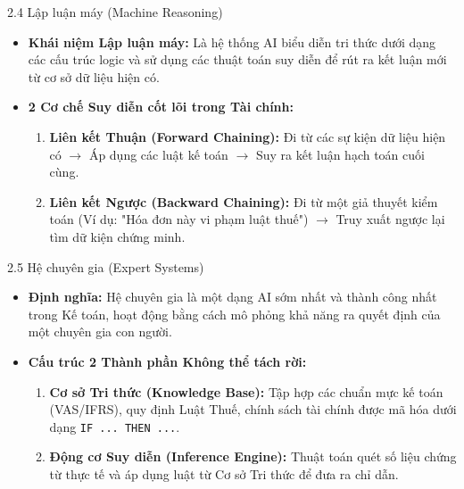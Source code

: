 \documentclass[aspectratio=169]{beamer}
\begin{document}
\begin{frame}{2.4 Lập luận máy (Machine Reasoning)}
    \begin{itemize}
        \item \textbf{Khái niệm Lập luận máy:} Là hệ thống AI biểu diễn tri thức dưới dạng các cấu trúc logic và sử dụng các thuật toán suy diễn để rút ra kết luận mới từ cơ sở dữ liệu hiện có.
        \item \textbf{2 Cơ chế Suy diễn cốt lõi trong Tài chính:}
        \begin{enumerate}
            \item \textbf{Liên kết Thuận (Forward Chaining):} Đi từ các sự kiện dữ liệu hiện có $\rightarrow$ Áp dụng các luật kế toán $\rightarrow$ Suy ra kết luận hạch toán cuối cùng.
            \item \textbf{Liên kết Ngược (Backward Chaining):} Đi từ một giả thuyết kiểm toán (Ví dụ: "Hóa đơn này vi phạm luật thuế") $\rightarrow$ Truy xuất ngược lại tìm dữ kiện chứng minh.
        \end{enumerate}
    \end{itemize}
\end{frame}

\begin{frame}{2.5 Hệ chuyên gia (Expert Systems)}
    \begin{itemize}
        \item \textbf{Định nghĩa:} Hệ chuyên gia là một dạng AI sớm nhất và thành công nhất trong Kế toán, hoạt động bằng cách mô phỏng khả năng ra quyết định của một chuyên gia con người.
        \item \textbf{Cấu trúc 2 Thành phần Không thể tách rời:}
        \begin{enumerate}
            \item \textbf{Cơ sở Tri thức (Knowledge Base):} Tập hợp các chuẩn mực kế toán (VAS/IFRS), quy định Luật Thuế, chính sách tài chính được mã hóa dưới dạng \texttt{IF ... THEN ...}.
            \item \textbf{Động cơ Suy diễn (Inference Engine):} Thuật toán quét số liệu chứng từ thực tế và áp dụng luật từ Cơ sở Tri thức để đưa ra chỉ dẫn.
        \end{enumerate}
    \end{itemize}
\end{frame}
\end{document}
